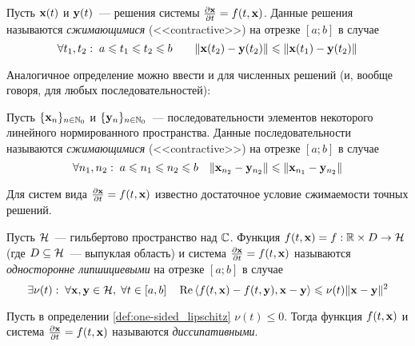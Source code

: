 \begin{definition}
    \label{def:contractivity}
    Пусть $ \mathbf{x}(t) $ и $ \mathbf{y}(t) $~--- решения системы $ \frac{\partial \mathbf{x}}{\partial t} = f(t, \mathbf{x}) $.
    Данные решения называются \emph{сжимающимися} (<<contractive>>) на отрезке $ [a; b] $ в случае
    \[
        \forall t_1, t_2: \; a \leqslant t_1 \leqslant t_2 \leqslant b \qquad \| \mathbf{x}(t_2) - \mathbf{y}(t_2) \| \leqslant \| \mathbf{x}(t_1) - \mathbf{y}(t_2) \|
    \]
\end{definition}

Аналогичное определение можно ввести и для численных решений (и, вообще говоря, для любых последовательностей):

\begin{definition}
    \label{def:contractivity_sequence}
    Пусть $ \{\mathbf{x}_n\}_{n \in \mathbb{N}_0} $ и $ \{\mathbf{y}_n\}_{n \in \mathbb{N}_0} $~--- последовательности элементов некоторого линейного нормированного пространства.
    Данные последовательности называются \emph{сжимающимися} (<<contractive>>) на отрезке $ [a; b] $ в случае
    \[
        \forall n_1, n_2: \; a \leqslant n_1 \leqslant n_2 \leqslant b \quad \| \mathbf{x}_{n_2} - \mathbf{y}_{n_2} \| \leqslant \| \mathbf{x}_{n_1} - \mathbf{y}_{n_2} \|
    \]
\end{definition}

Для систем вида $ \frac{\partial \mathbf{x}}{\partial t} = f(t, \mathbf{x}) $ известно \cite{auzinger1990note, auzinger1993modern} достаточное условие
сжимаемости точных решений.

\begin{definition}
    \label{def:one-sided_lipschitz}
    Пусть $ \mathcal{H} $~--- гильбертово пространство над $ \mathbb{C} $.
    Функция $ f(t, \mathbf{x}) = f: \mathbb{R} \times D \to \mathcal{H} $
    (где $ D \subseteq \mathcal{H} $~--- выпуклая область)
    и система $ \frac{\partial \mathbf{x}}{\partial t} = f(t, \mathbf{x}) $ называются \emph{односторонне липшициевыми} на отрезке $ [a; b] $ в случае
    \[
        \exists \nu(t): \; \forall \mathbf{x}, \mathbf{y} \in \mathcal{H}, \; \forall t \in [a, b] \quad
        \operatorname{Re} \left\langle f(t, \mathbf{x}) - f(t, \mathbf{y}), \mathbf{x} - \mathbf{y} \right\rangle \leqslant \nu(t) \| \mathbf{x} - \mathbf{y} \|^2
    \]
\end{definition}

\begin{definition}
    \label{def:dissipative}
    Пусть в определении \ref{def:one-sided_lipschitz} $ \nu(t) \leqslant 0 $.
    Тогда функция $ f(t, \mathbf{x}) $ и система $ \frac{\partial \mathbf{x}}{\partial t} = f(t, \mathbf{x}) $ называются \emph{диссипативными}.
\end{definition}

